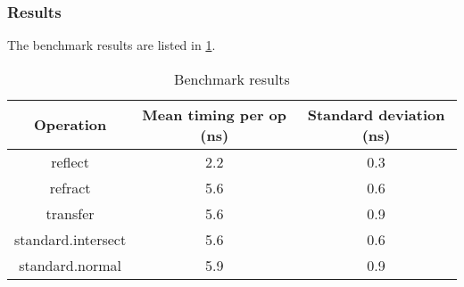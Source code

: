 \subsubsection{Results}
The benchmark results are listed in \cref{tab:benchmark}.

\begin{table} \caption{\label{tab:benchmark} Benchmark results}
\begin{tabular} {| c | c | c |} \hline
\textbf{Operation} & \textbf{Mean timing per op (ns)} &
  \textbf{Standard deviation (ns)} \\ \hline
reflect & 2.2 & 0.3 \\ \hline
refract & 5.6 & 0.6 \\ \hline
transfer & 5.6 & 0.9 \\ \hline
standard.intersect & 5.6 & 0.6 \\ \hline
standard.normal & 5.9 & 0.9 \\ \hline
\end{tabular}\end{table}

